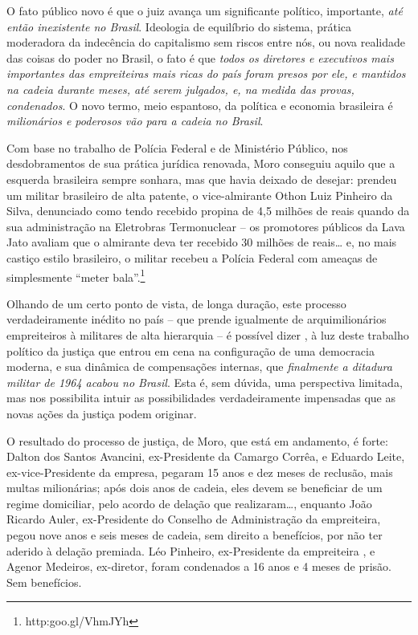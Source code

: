 O fato público novo é que o juiz avança um significante político,
importante, \emph{até então inexistente no Brasil}. Ideologia de
equilíbrio do sistema, prática moderadora da indecência do capitalismo
sem riscos entre nós, ou nova realidade das coisas do poder no Brasil, o
fato é que \emph{todos os diretores e executivos mais importantes das
empreiteiras mais ricas do país foram presos por ele, e mantidos na
cadeia durante meses, até serem julgados, e, na medida das provas,
condenados}. O novo termo, meio espantoso, da política e economia
brasileira é \emph{milionários e poderosos vão para a cadeia no Brasil}.

Com base no trabalho de Polícia Federal e de Ministério Público, nos
desdobramentos de sua prática jurídica renovada, Moro conseguiu aquilo
que a esquerda brasileira sempre sonhara, mas que havia deixado de
desejar: prendeu um militar brasileiro de alta patente, o vice-almirante
Othon Luiz Pinheiro da Silva, denunciado como tendo recebido propina de
4,5 milhões de reais quando da sua administração na Eletrobras
Termonuclear -- os promotores públicos da Lava Jato avaliam que o
almirante deva ter recebido 30 milhões de reais… e, no mais castiço
estilo brasileiro, o militar recebeu a Polícia Federal com ameaças de
simplesmente ``meter bala''.\footnote{http:goo.gl/VhmJYh}

Olhando de um certo ponto de vista, de longa duração, este processo
verdadeiramente inédito no país -- que prende igualmente de
arquimilionários empreiteiros à militares de alta hierarquia -- é
possível dizer , à luz deste trabalho político da justiça que entrou em
cena na configuração de uma democracia moderna, e sua dinâmica de
compensações internas, que \emph{finalmente a ditadura militar de 1964
acabou no Brasil}. Esta é, sem dúvida, uma perspectiva limitada, mas nos
possibilita intuir as possibilidades verdadeiramente impensadas que as
novas ações da justiça podem originar.

O resultado do processo de justiça, de Moro, que está em andamento, é
forte: Dalton dos Santos Avancini, ex-Presidente da Camargo Corrêa, e
Eduardo Leite, ex-vice-Presidente da empresa, pegaram 15 anos e dez
meses de reclusão, mais multas milionárias; após dois anos de cadeia,
eles devem se beneficiar de um regime domiciliar, pelo acordo de delação
que realizaram…, enquanto João Ricardo Auler, ex-Presidente do
Conselho de Administração da empreiteira, pegou nove anos e seis meses
de cadeia, sem direito a benefícios, por não ter aderido à delação
premiada. Léo Pinheiro, ex-Presidente da empreiteira , e Agenor
Medeiros, ex-diretor, foram condenados a 16 anos e 4 meses de prisão.
Sem benefícios.

